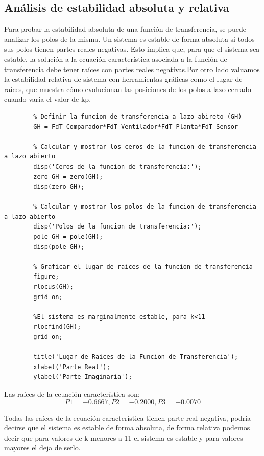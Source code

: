 \documentclass[12pt]{article}
\begin{document}
	\subsection{Análisis de estabilidad absoluta y relativa}
	Para probar la estabilidad absoluta de una función de transferencia, se puede analizar los polos de la misma. Un sistema es estable de forma absoluta si todos sus polos tienen partes reales negativas. Esto implica que, para que el sistema sea estable, la solución a la ecuación característica asociada a la función de transferencia debe tener raíces con partes reales negativas.Por otro lado valuamos la estabilidad relativa de sistema con herramientas gráficas como el lugar de raíces, que muestra cómo evolucionan las posiciones de los polos a lazo cerrado cuando varia el valor de kp.
	
	\begin{lstlisting}
		% Definir la funcion de transferencia a lazo abireto (GH)
		GH = FdT_Comparador*FdT_Ventilador*FdT_Planta*FdT_Sensor
		
		% Calcular y mostrar los ceros de la funcion de transferencia a lazo abierto
		disp('Ceros de la funcion de transferencia:');
		zero_GH = zero(GH);
		disp(zero_GH);
		
		% Calcular y mostrar los polos de la funcion de transferencia a lazo abierto
		disp('Polos de la funcion de transferencia:');
		pole_GH = pole(GH);
		disp(pole_GH);
		
		% Graficar el lugar de raices de la funcion de transferencia
		figure;
		rlocus(GH);
		grid on;
		
		%El sistema es marginalmente estable, para k<11
		rlocfind(GH);
		grid on;
		
		title('Lugar de Raices de la Funcion de Transferencia');
		xlabel('Parte Real');
		ylabel('Parte Imaginaria');
	\end{lstlisting} 
	
	Las raíces de la ecuación característica son:
	\begin{equation}
		P1=-0.6667   ,P2=-0.2000	,P3=-0.0070
	\end{equation}
	
	Todas las raíces de la ecuación característica tienen parte real negativa, podría decirse que el sistema es estable de forma absoluta, de forma relativa podemos decir que  para valores de k menores a 11 el sistema es estable y para valores mayores el  deja de serlo.\newpage
	  
\end{document}
